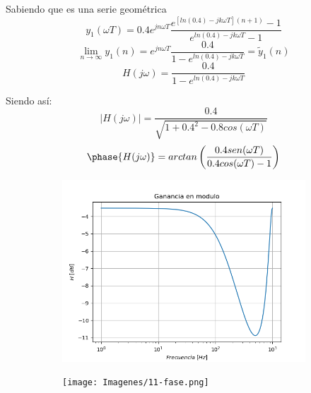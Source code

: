 Sabiendo que es una serie geométrica
\begin{equation*}
	y_1 (\omega T) = 0.4 e^{j n \omega T } \frac{ e^{ \left[ ln \left( 0.4 \right) - j k \omega T \right] \left(n + 1 \right) } - 1}{e^{ ln \left( 0.4 \right) - j k \omega T} - 1}
\end{equation*}
\begin{equation*}
	\lim_{n\to\infty} y_1 (n) = e^{j n \omega T } \frac{0.4}{1 - e^{ ln \left( 0.4 \right) - j k \omega T}} = \tilde{y}_1(n)	
\end{equation*}
\begin{equation*}
	H(j \omega) = \frac{0.4}{1 - e^{ ln \left( 0.4 \right) - j k \omega T}}	
\end{equation*}

Siendo así:
\begin{equation*}
	|H(j \omega)| = \frac{0.4}{\sqrt{1 + 0.4^2 - 0.8 cos( \omega T)}}	
\end{equation*}
\begin{equation*}
	\phase{H(j \omega)} = arctan \left( \frac{0.4 sen( \omega T)}{0.4 cos( \omega T) - 1} \right)
\end{equation*}

\begin{figure}[H]
\centering
\begin{subfigure}{.49\textwidth}
\centering
	\includegraphics[width=\textwidth]{Imagenes/11-modulo.png}
\end{subfigure}
\begin{subfigure}{.49\textwidth}
\centering
	\texttt{[image: Imagenes/11-fase.png]}
\end{subfigure}
\end{figure}

